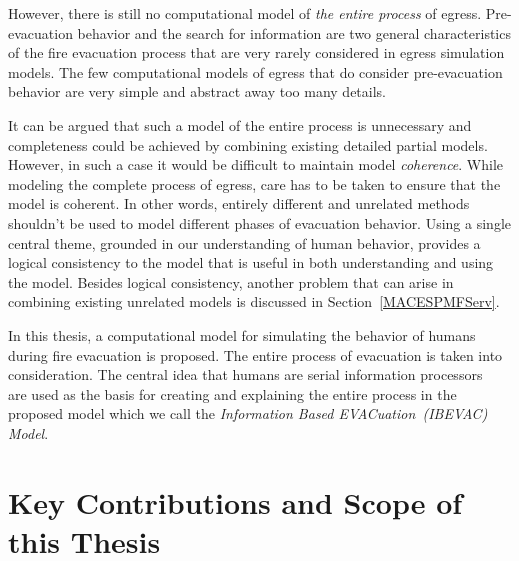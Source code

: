 However, there is still no computational model of \emph{the entire process} of egress. Pre-evacuation behavior and the search for information are two general characteristics of the fire evacuation process that are very rarely considered in egress simulation models. The few computational models of egress that do consider pre-evacuation~\cite{Pires:2005gs,Klupfel:2003wa} behavior are very simple and abstract away too many details. 

It can be argued that such a model of the entire process is unnecessary and completeness could be achieved by combining existing detailed partial models. However, in such a case it would be difficult to maintain model \emph{coherence}. While modeling the complete process of egress, care has to be taken to ensure that the model is coherent. In other words, entirely different and unrelated methods shouldn't be used to model different phases of evacuation behavior. Using a single central theme, grounded in our understanding of human behavior, provides a logical consistency to the model that is useful in both understanding and using the model. Besides logical consistency, another problem that can arise in combining existing unrelated models is discussed in Section~\ref{MACESPMFServ}.

In this thesis, a computational model for simulating the behavior of humans during fire evacuation is proposed. The entire process of evacuation is taken into consideration. The central idea that humans are serial information processors~\cite{Ozel:2001tn} are used as the basis for creating and explaining the entire process in the proposed model which we call the \emph{Information Based EVACuation~(IBEVAC) Model}.


\section{Key Contributions and Scope of this Thesis}
\label{Intro:Contributions}


